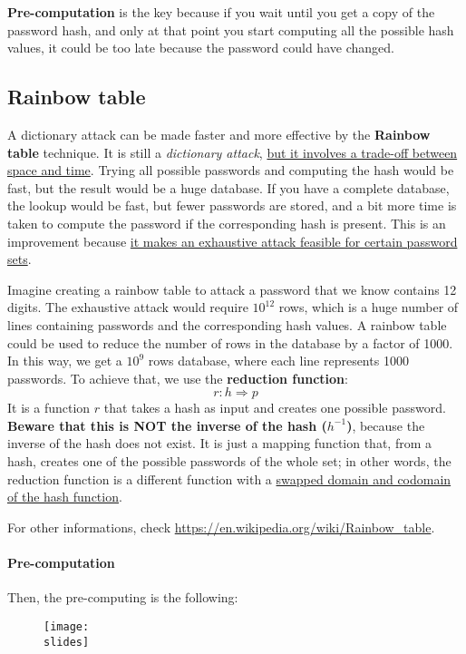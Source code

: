 \textbf{Pre-computation} is the key because if you wait until you get a copy of the password hash, and only at that point you start computing all the possible hash values, it could be too late because the password could have changed.

\subsection{Rainbow table}
A dictionary attack can be made faster and more effective by the \textbf{Rainbow table} technique. It is still a \textit{dictionary attack}, \ul{but it involves a trade-off between space and time}. Trying all possible passwords and computing the hash would be fast, but the result would be a huge database. If you have a complete database, the lookup would be fast, but fewer passwords are stored, and a bit more time is taken to compute the password if the corresponding hash is present. This is an improvement because \ul{it makes an exhaustive attack feasible for certain password sets}.

Imagine creating a rainbow table to attack a password that we know contains 12 digits.
The exhaustive attack would require $10^{12}$ rows, which is a huge number of lines containing passwords and the corresponding hash values.
A rainbow table could be used to reduce the number of rows in the database by a factor of 1000. In this way, we get a $10^9$ rows database, where each line represents 1000 passwords. To achieve that, we use the \textbf{reduction function}:
\[
  r: h \Rightarrow p
\]
It is a function $r$ that takes a hash as input and creates one possible password. \textbf{Beware that this is NOT the inverse of the hash ($h^{-1}$)}, because the inverse of the hash does not exist. It is just a mapping function that, from a hash, creates one of the possible passwords of the whole set; in other words, the reduction function is a different function with a \ul{swapped domain and codomain of the hash function}.

For other informations, check \url{https://en.wikipedia.org/wiki/Rainbow_table}.

\paragraph*{Pre-computation}
Then, the pre-computing is the following:

\begin{figure}[h]
  \centering
  \texttt{[image: \\slides]}
\end{figure}

